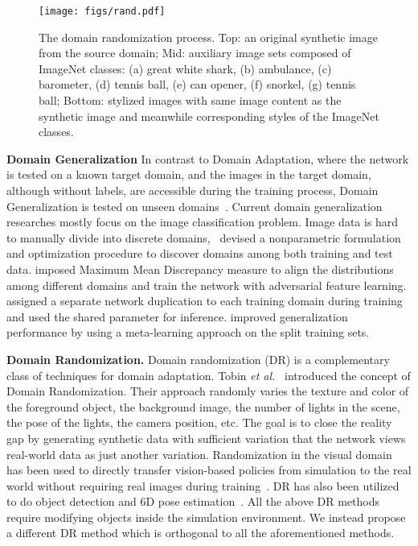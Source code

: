 \documentclass[10pt,twocolumn,letterpaper]{article}
\begin{document}
\begin{figure*}[t]
  \centering
  \texttt{[image: figs/rand.pdf]}
\caption{The domain randomization process. Top: an original synthetic image from the source domain; Mid: auxiliary image sets composed of ImageNet classes: (a) great white shark, (b) ambulance, (c) barometer, (d) tennis ball, (e) can opener, (f) snorkel, (g) tennis ball; Bottom: stylized images with same image content as the synthetic image and meanwhile corresponding styles of the ImageNet classes.}
  \label{fig:randomization}
  \vspace{-5pt}
\end{figure*} 

\textbf{Domain Generalization}
In contrast to Domain Adaptation, where the network is tested on a known target domain, and the images in the target domain, although without labels, are accessible during the training process, Domain Generalization is tested on unseen domains~\cite{muandet2013domain,gan2016learning}. Current domain generalization researches mostly focus on the image classification problem. Image data is hard to manually divide into discrete domains,~\cite{gong2013reshaping} devised a nonparametric formulation and optimization procedure to discover domains among both training and test data. \cite{li2018domain} imposed Maximum Mean Discrepancy measure to align the distributions among different domains and train the network with adversarial feature learning. \cite{li2017deeper} assigned a separate network duplication to each training domain during training and used the shared parameter for inference. \cite{li2018learning} improved generalization performance by using a meta-learning approach on the split training sets.


\textbf{Domain Randomization.}
Domain randomization (DR) is a complementary class of techniques for domain adaptation. Tobin \textit{et al.}~\cite{tobin2017domain} introduced the concept of Domain Randomization. Their approach randomly varies the texture and color of the foreground object, the background image, the number of lights in the scene, the
pose of the lights, the camera position, etc.  The goal is to close the reality gap by generating synthetic data with sufficient variation that the network views real-world data as just another variation. Randomization in the visual domain has been used to directly transfer vision-based policies from simulation to the real world without requiring real images during training~\cite{sadeghi2016cad2rl, tobin2017domain}. DR has also been utilized to do object detection and 6D pose estimation~\cite{nvidia_1,nvidia_2,6d_detection}. 
All the above DR methods require modifying objects inside the simulation environment. We instead propose a different DR method which is orthogonal to all the aforementioned methods. 
\end{document}
